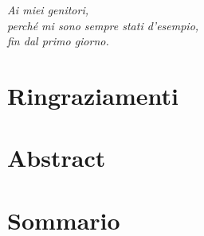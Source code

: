 \documentclass{Configuration_Files/PoliMi3i_thesis}
\begin{document}
\newpage
\thispagestyle{empty}
\begin{minipage}{\textwidth}
    \vspace{2cm}
    \begin{flushright}
    \textit{Ai miei genitori,\\[2ex]perché mi sono sempre stati d'esempio,\\[2ex]fin dal primo giorno.}
    \end{flushright}
\end{minipage}
\cleardoublepage



\startpreamble
\setcounter{page}{1} %
\thispagestyle{empty}
\tableofcontents %
\thispagestyle{empty}
\cleardoublepage

\thispagestyle{empty}
\listoffigures
\cleardoublepage

\listoftables

\cleardoublepage




\chapter*{Ringraziamenti}



\chapter*{Abstract}



\chapter*{Sommario}

\cleardoublepage



\mainmatter %
\end{document}
